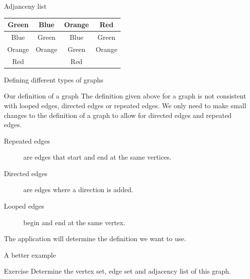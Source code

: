 \begin{frame}{Adjanceny list}
	\begin{center}
	\begin{tabular}{c@{\hskip 0.5cm}c@{\hskip 0.5cm}c@{\hskip 0.5cm}c}
	Green & Blue & Orange & Red \\
  \midrule
	Blue & Green & Blue & Green \\
	Orange & Orange & Green & Orange \\
	Red & & Red & \\
	\end{tabular}
	\end{center}
\end{frame}

\begin{frame}{Defining different types of graphs}
	
	\begin{block}{Our definition of a graph}
	The definition given above for a graph is not consistent with looped edges, directed edges or repeated edges. We only need to make small changes to the definition of a graph to allow for directed edges and repeated edges.
	\end{block}
	
	\begin{description}
		\item[Repeated edges] are edges that start and end at the same vertices.
		\item[Directed edges] are edges where a direction is added.
		\item[Looped edges] begin and end at the same vertex.
	\end{description}
	
	The application will determine the definition we want to use.
\end{frame}


\begin{frame}{A better example}
  \begin{adjustbox}{max width={0.9\textwidth},center} 
  \end{adjustbox}
  \vspace{0.1cm}
  \begin{block}{Exercise}
	Determine the vertex set, edge set and adjacency list of this graph.
  \end{block}
  
\end{frame}


